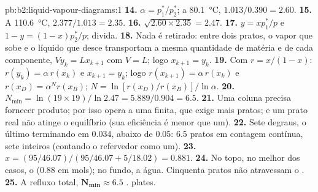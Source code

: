 \begin{solution}{pb:b2:liquid-vapour-diagrams:1}
\textbf{14.} $\alpha = p_1^*/p_2^*$; a \qty{80.1}{\degreeCelsius}, $1.013/0.390 =
2.60$.
\textbf{15.} A \qty{110.6}{\degreeCelsius}, $2.377/1.013 = 2.35$.
\textbf{16.} $\sqrt{2.60 \times 2.35} = 2.47$.
\textbf{17.} $y = xp_1^*/p$ e $1 - y = (1 - x)p_2^*/p$; divida.
\textbf{18.} Nada é retirado: entre dois pratos, o vapor que sobe e o líquido
que desce transportam a mesma quantidade de matéria e de cada componente,
$V y_k = L x_{k+1}$ com $V = L$; logo $x_{k+1} = y_k$.
\textbf{19.} Com $r = x/(1 - x)$: $r(y_k) = \alpha\,r(x_k)$ e $x_{k+1} = y_k$; logo
$r(x_{k+1}) = \alpha\,r(x_k)$ e $r(x_D) = \alpha^N r(x_B)$; $N = \ln[r(x_D)/
r(x_B)]/\ln\alpha$.
\textbf{20.} $N_{\min} = \ln(19 \times 19)/\ln 2.47 = 5.889/0.904 = 6.5$.
\textbf{21.} Uma coluna precisa fornecer produto; por isso opera a uma  finita, que exige mais pratos; e um prato real não atinge o equilíbrio
(sua eficiência é menor que um).
\textbf{22.} Sete degraus, o último terminando em 0.034, abaixo de 0.05: 6.5
pratos em contagem contínua, sete inteiros (contando o refervedor como um).
\textbf{23.} $x = (95/46.07)/(95/46.07 + 5/18.02) = 0.881$.
\textbf{24.} No topo, no melhor dos casos, o  (0.88 em mols); no fundo,
a água. Cinquenta pratos não atravessam o .
\textbf{25.} A refluxo total, $\boldsymbol{N_{\min} \approx 6.5}$ .
plates.
\end{solution}
